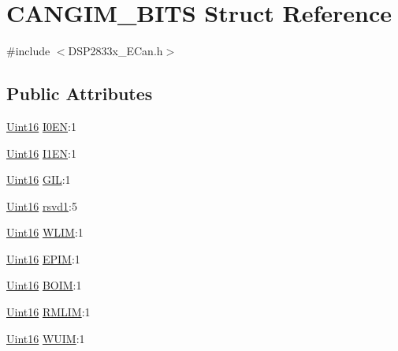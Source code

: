 \hypertarget{struct_c_a_n_g_i_m___b_i_t_s}{}\section{C\+A\+N\+G\+I\+M\+\_\+\+B\+I\+T\+S Struct Reference}
\label{struct_c_a_n_g_i_m___b_i_t_s}


{\ttfamily \#include $<$D\+S\+P2833x\+\_\+\+E\+Can.\+h$>$}

\subsection*{Public Attributes}
\begin{DoxyCompactItemize}
\item 
\hyperlink{_d_s_p2833x___device_8h_a59a9f6be4562c327cbfb4f7e8e18f08b}{Uint16} \hyperlink{struct_c_a_n_g_i_m___b_i_t_s_ae900b32fe9bb894254cadeb9603af0c6}{I0\+E\+N}\+:1
\item 
\hyperlink{_d_s_p2833x___device_8h_a59a9f6be4562c327cbfb4f7e8e18f08b}{Uint16} \hyperlink{struct_c_a_n_g_i_m___b_i_t_s_a29e2dd14156e35a2bb6926419ee57efe}{I1\+E\+N}\+:1
\item 
\hyperlink{_d_s_p2833x___device_8h_a59a9f6be4562c327cbfb4f7e8e18f08b}{Uint16} \hyperlink{struct_c_a_n_g_i_m___b_i_t_s_a13559b00fe34c34e7b2516b4305c941b}{G\+I\+L}\+:1
\item 
\hyperlink{_d_s_p2833x___device_8h_a59a9f6be4562c327cbfb4f7e8e18f08b}{Uint16} \hyperlink{struct_c_a_n_g_i_m___b_i_t_s_a0fa065baabf1ff6bacbdf6f4c40f650e}{rsvd1}\+:5
\item 
\hyperlink{_d_s_p2833x___device_8h_a59a9f6be4562c327cbfb4f7e8e18f08b}{Uint16} \hyperlink{struct_c_a_n_g_i_m___b_i_t_s_aa7b72bc1a7789df13a15d943e47ed67c}{W\+L\+I\+M}\+:1
\item 
\hyperlink{_d_s_p2833x___device_8h_a59a9f6be4562c327cbfb4f7e8e18f08b}{Uint16} \hyperlink{struct_c_a_n_g_i_m___b_i_t_s_a741b91312b599e5b43d01deabad84aa5}{E\+P\+I\+M}\+:1
\item 
\hyperlink{_d_s_p2833x___device_8h_a59a9f6be4562c327cbfb4f7e8e18f08b}{Uint16} \hyperlink{struct_c_a_n_g_i_m___b_i_t_s_a71da6fa9c238822b5ad4b5d2b78c8a1f}{B\+O\+I\+M}\+:1
\item 
\hyperlink{_d_s_p2833x___device_8h_a59a9f6be4562c327cbfb4f7e8e18f08b}{Uint16} \hyperlink{struct_c_a_n_g_i_m___b_i_t_s_a2f67f4476db67992ce490563e6ca8c69}{R\+M\+L\+I\+M}\+:1
\item 
\hyperlink{_d_s_p2833x___device_8h_a59a9f6be4562c327cbfb4f7e8e18f08b}{Uint16} \hyperlink{struct_c_a_n_g_i_m___b_i_t_s_a9a01cf77ca7e5f9578451cc8ae3476e7}{W\+U\+I\+M}\+:1

\end{DoxyCompactItemize}
